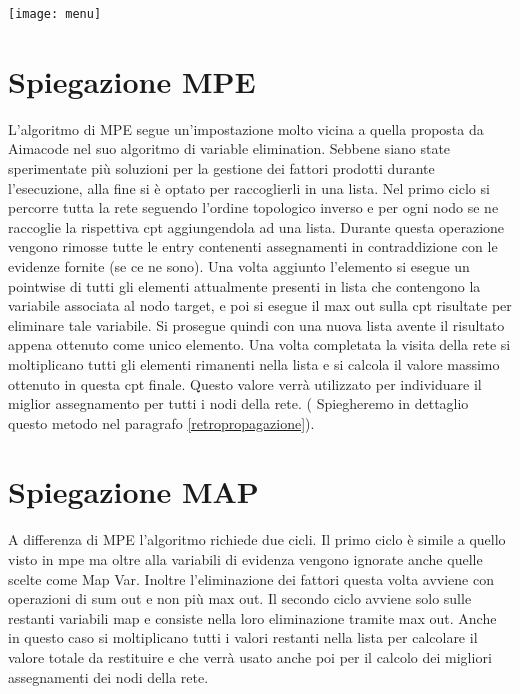 \begin{minipage}{\linewidth}
	\centering
	\texttt{[image: menu]}
	\label{codice} 
\end{minipage}

\section{Spiegazione MPE}
L’algoritmo di MPE segue un’impostazione molto vicina a quella proposta da Aimacode nel suo algoritmo di variable elimination. 
Sebbene siano state sperimentate più soluzioni per la gestione dei fattori prodotti durante l’esecuzione, alla fine si è optato per raccoglierli in una lista. Nel primo ciclo si percorre tutta la rete seguendo l’ordine topologico inverso e per ogni nodo se ne raccoglie la rispettiva cpt aggiungendola ad una lista. Durante questa operazione vengono rimosse tutte le entry contenenti assegnamenti in contraddizione con le evidenze fornite (se ce ne sono). Una volta aggiunto l’elemento si esegue un pointwise di tutti gli elementi attualmente presenti in lista che contengono la variabile associata al nodo target, e poi si esegue il max out sulla cpt risultate per eliminare tale variabile. Si prosegue quindi con una nuova lista avente il risultato appena ottenuto come unico elemento. Una volta completata la visita della rete si moltiplicano tutti gli elementi rimanenti nella lista e si calcola il valore massimo ottenuto in questa cpt finale. Questo valore verrà utilizzato per individuare il miglior assegnamento per tutti i nodi della rete. ( Spiegheremo in dettaglio questo metodo nel paragrafo \ref{retropropagazione}).

\section{Spiegazione MAP}
A differenza di MPE l’algoritmo richiede due cicli. Il primo ciclo è simile a quello visto in mpe ma oltre alla variabili di evidenza vengono ignorate anche quelle scelte come Map Var. Inoltre l’eliminazione dei fattori questa volta avviene con operazioni di sum out e non più max out. Il secondo ciclo avviene solo sulle restanti variabili map e consiste nella loro eliminazione tramite max out. Anche in questo caso si moltiplicano tutti i valori restanti nella lista per calcolare il valore totale da restituire e che verrà usato anche poi per il calcolo dei migliori assegnamenti dei nodi della rete.

